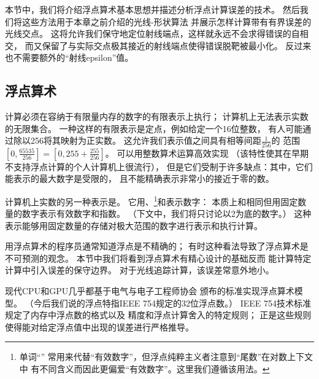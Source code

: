 本节中，我们将介绍浮点算术基本思想并描述分析浮点计算误差的技术。
然后我们将这些方法用于本章之前介绍的光线-形状算法
并展示怎样计算带有有界误差的光线交点。
这将允许我们保守地定位射线端点，这样就永远不会求得错误的自相交，
而又保留了与实际交点极其接近的射线端点使得错误脱靶被最小化。
反过来也不需要额外的“射线epsilon”值。

\subsection{浮点算术}\label{sub:浮点算术}
计算必须在容纳于有限量内存的数字的有限表示上执行；
计算机上无法表示实数的无限集合。
一种这样的有限表示是定点，例如给定一个16位整数，
有人可能通过除以256将其映射为正实数。
这允许我们表示值之间具有相等间距$\displaystyle\frac{1}{256}$的
范围$\displaystyle\left[0,\frac{65535}{256}\right]=\left[0,255+\frac{255}{256}\right]$。
可以用整数算术运算高效实现
（该特性使其在早期不支持浮点计算的个人计算机上很流行），
但是它们受制于许多缺点：其中，它们能表示的最大数字是受限的，
且不能精确表示非常小的接近于零的数。

计算机上实数的另一种表示是。
它用、\footnote{单词“\protect{}”
    常用来代替“有效数字”，但浮点纯粹主义者注意到“尾数”在对数上下文中
    有不同含义而因此更偏爱“有效数字”。这里我们遵循该用法。}和表示数字：
本质上和相同但用固定数量的数字表示有效数字和指数。
（下文中，我们将只讨论以2为底的数字。）
这种表示能够用固定数量的存储对极大范围的数字进行表示和执行计算。

用浮点算术的程序员通常知道浮点是不精确的；
有时这种看法导致了浮点算术是不可预测的观念。
本节中我们将看到浮点算术有精心设计的基础反而
能计算特定计算中引入误差的保守边界。
对于光线追踪计算，该误差常意外地小。

现代CPU和GPU几乎都基于电气与电子工程师协会
颁布的标准\parencite*{10.1109/IEEESTD.1985.82928,10.1109/IEEESTD.2008.4610935}实现浮点算术模型。
（今后我们说的浮点特指IEEE 754规定的32位浮点数。）
IEEE 754技术标准规定了内存中浮点数的格式以及
精度和浮点计算舍入的特定规则；
正是这些规则使得能对给定浮点值中出现的误差进行严格推导。

